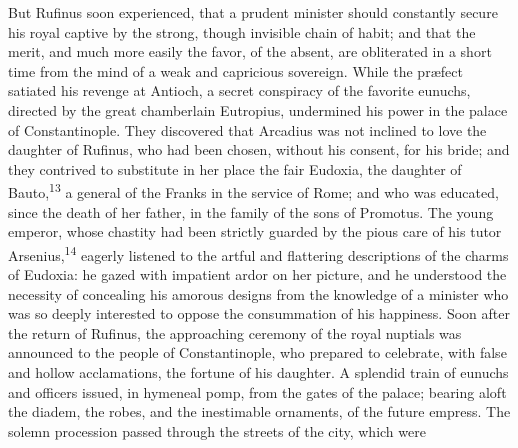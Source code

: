 

But Rufinus soon experienced, that a prudent minister should
constantly secure his royal captive by the strong, though
invisible chain of habit; and that the merit, and much more
easily the favor, of the absent, are obliterated in a short time
from the mind of a weak and capricious sovereign. While the
præfect satiated his revenge at Antioch, a secret conspiracy of
the favorite eunuchs, directed by the great chamberlain
Eutropius, undermined his power in the palace of Constantinople.
They discovered that Arcadius was not inclined to love the
daughter of Rufinus, who had been chosen, without his consent,
for his bride; and they contrived to substitute in her place the
fair Eudoxia, the daughter of Bauto,\textsuperscript{13} a general of the Franks
in the service of Rome; and who was educated, since the death of
her father, in the family of the sons of Promotus. The young
emperor, whose chastity had been strictly guarded by the pious
care of his tutor Arsenius,\textsuperscript{14} eagerly listened to the artful and
flattering descriptions of the charms of Eudoxia: he gazed with
impatient ardor on her picture, and he understood the necessity
of concealing his amorous designs from the knowledge of a
minister who was so deeply interested to oppose the consummation
of his happiness. Soon after the return of Rufinus, the
approaching ceremony of the royal nuptials was announced to the
people of Constantinople, who prepared to celebrate, with false
and hollow acclamations, the fortune of his daughter. A splendid
train of eunuchs and officers issued, in hymeneal pomp, from the
gates of the palace; bearing aloft the diadem, the robes, and the
inestimable ornaments, of the future empress. The solemn
procession passed through the streets of the city, which were
